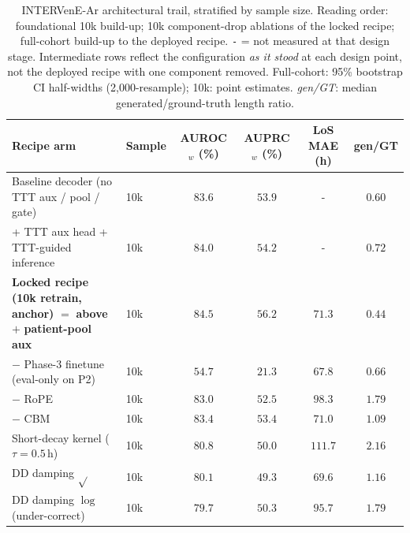 \begin{table}[!t]
\caption{INTERVenE-Ar architectural trail, stratified by sample size. Reading order: foundational 10k build-up; 10k component-drop ablations of the locked recipe; full-cohort build-up to the deployed recipe. \texttt{-} = not measured at that design stage. Intermediate rows reflect the configuration \emph{as it stood} at each design point, not the deployed recipe with one component removed. Full-cohort: 95\% bootstrap CI half-widths (2{,}000-resample); 10k: point estimates. \emph{gen/GT}: median generated/ground-truth length ratio.}
\label{tab:abl-ar-all}
\centering
\small
\setlength{\tabcolsep}{4pt}
\begin{tabular}{llcccc}
\toprule
Recipe arm & Sample & AUROC$_w$ (\%) & AUPRC$_w$ (\%) & LoS MAE (h) & gen/GT \\
\midrule
Baseline decoder (no TTT aux / pool / gate)      & 10k  & $83.6$                    & $53.9$                    & -                       & $0.60$ \\
\quad + TTT aux head + TTT-guided inference      & 10k  & $84.0$                    & $54.2$                    & -                       & $0.72$ \\
\midrule
\textbf{Locked recipe (10k retrain, anchor)} $=$ \textbf{above} $+$ \textbf{patient-pool aux}     & 10k  & $\mathbf{84.5}$           & $\mathbf{56.2}$           & $71.3$                  & $0.44$ \\
\quad $-$ Phase-3 finetune (eval-only on P2)     & 10k  & $54.7$                    & $21.3$                    & $67.8$                  & $0.66$ \\
\quad $-$ RoPE                                   & 10k  & $83.0$                    & $52.5$                    & $98.3$                  & $1.79$ \\
\quad $-$ CBM                                    & 10k  & $83.4$                    & $53.4$                    & $71.0$                  & $1.09$ \\
\quad Short-decay kernel ($\tau{=}0.5$\,h)          & 10k  & $80.8$                    & $50.0$                    & $111.7$                 & $2.16$ \\
\quad DD damping $\sqrt{}$                       & 10k  & $80.1$                    & $49.3$                    & $69.6$                  & $1.16$ \\
\quad DD damping $\log$ (under-correct)          & 10k  & $79.7$                    & $50.3$                    & $95.7$                  & $1.79$ \\

\end{tabular}
\end{table}
